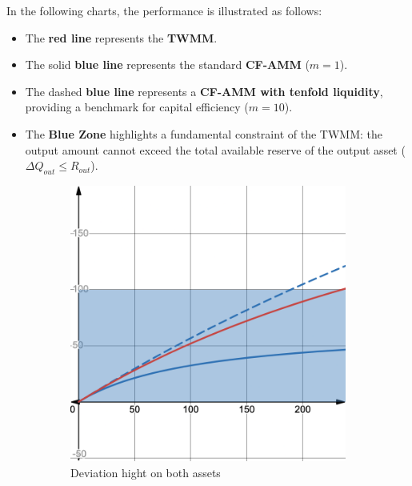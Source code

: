 In the following charts, the performance is illustrated as follows:
\begin{itemize}
	\item The \textbf{red line} represents the \textbf{TWMM}.
	\item The solid \textbf{blue line} represents the standard \textbf{CF-AMM} ($m=1$).
	\item The dashed \textbf{blue line} represents a \textbf{CF-AMM with tenfold liquidity}, providing a benchmark for capital efficiency ($m=10$).
\item The \textbf{Blue Zone} highlights a fundamental constraint of the TWMM: the output amount cannot exceed the total available reserve of the output asset ($\Delta Q_{out} \leq R_{out}$).
\end{itemize}
\begin{figure}[h!]
	\centering
	\begin{subfigure}{0.4\textwidth} %
		\centering
		\includegraphics[width=\linewidth]{comparing_with_cfamm_deviation_big.png} %
		\caption{Deviation hight on both assets}
		\label{fig:img4}
	\end{subfigure}
	\hfill %
	\begin{subfigure}{0.4\textwidth}
		\centering

\end{subfigure}
\end{figure}
